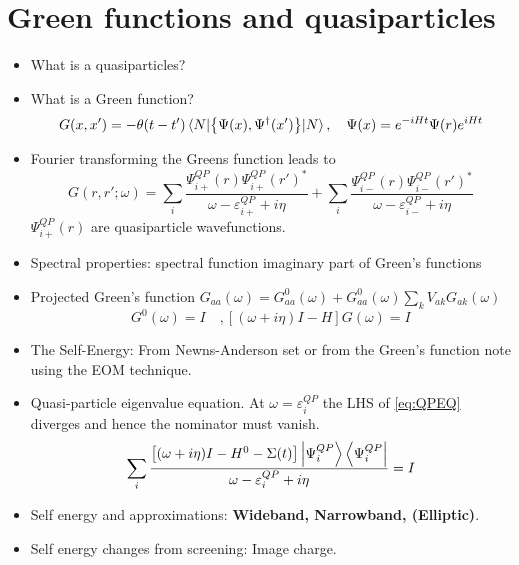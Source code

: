 \documentclass{article}
\begin{document}
\newpage
\section{Green functions and quasiparticles}
\begin{itemize}
    \item What is a quasiparticles?
    \item What is a Green function? 
    \begin{equation}
        G(x,x') = - \theta(t-t') \mel{N}{\acomm{\Psi(x)}{\Psi^{\dagger}(x')}}{N}, \quad \Psi(x) = e^{-i H t} \Psi(r) e^{i H t}
    \end{equation}
    \item Fourier transforming the Greens function leads to
\begin{equation}
    G(r,r';\omega) = \sum_i \dfrac{\Psi_{i+}^{QP}(r)\Psi_{i+}^{QP}(r')^{*}}{\omega - \varepsilon_{i+}^{QP} + i\eta} + \sum_i \dfrac{\Psi_{i-}^{QP}(r)\Psi_{i-}^{QP}(r')^{*}}{\omega - \varepsilon_{i-}^{QP} + i\eta}
\end{equation}
$\Psi_{i+}^{QP}(r)$ are quasiparticle wavefunctions.
\item Spectral properties: spectral function imaginary part of Green's functions
\item Projected Green's function $G_{aa}(\omega) = G^{0}_{aa}(\omega) + G^{0}_{aa}(\omega)\sum_{k}V_{ak}G_{ak}(\omega)$
\begin{equation}
    [(\omega + i\eta)I -H_0]G^{0}(\omega) = I \quad, [(\omega + i\eta)I -H]G(\omega) = I
\end{equation}
\item The Self-Energy: From Newns-Anderson set or from the Green's function note using the EOM technique.
    \item Quasi-particle eigenvalue equation. At $\omega = \varepsilon_i^{QP}$ the LHS of \eqref{eq:QPEQ} diverges and hence the nominator must vanish.
\begin{equation}\label{eq:QPEQ}
    \sum_{i} \dfrac{\qty[\qty(\omega + i \eta) I - H^{0} - \Sigma\qty(t)] \ket{\Psi_i^{QP}}\bra{\Psi_i^{QP}}}{\omega - \varepsilon_i^{QP} + i \eta} = I 
\end{equation}
\item Self energy and approximations: \textbf{Wideband, Narrowband, (Elliptic)}.
\item Self energy changes from screening: Image charge.
\end{itemize}
\end{document}
